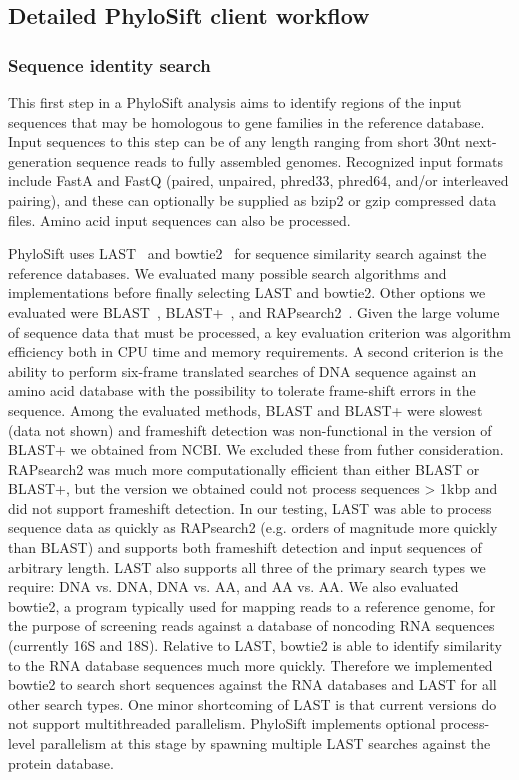 \documentclass[10pt]{article}
\begin{document}
\subsection*{Detailed PhyloSift client workflow}
\subsubsection*{Sequence identity search}
This first step in a PhyloSift analysis aims to identify regions of the input sequences that may be homologous to gene families in the reference database.
Input sequences to this step can be of any length ranging from short 30nt next-generation sequence reads to fully assembled genomes.
Recognized input formats include FastA and FastQ (paired, unpaired, phred33, phred64, and/or interleaved pairing), and these can optionally be supplied as bzip2 or gzip compressed data files. 
Amino acid input sequences can also be processed.

PhyloSift uses LAST~\cite{Kiełbasa2011} and bowtie2~\cite{Langmead2009} for sequence similarity search against the reference databases.
We evaluated many possible search algorithms and implementations before finally selecting LAST and bowtie2. 
Other options we evaluated were BLAST~\cite{Altschul1997}, BLAST+~\cite{Camacho2009}, and RAPsearch2~\cite{Zhao2011}.
Given the large volume of sequence data that must be processed, a key evaluation criterion was algorithm efficiency both in CPU time and memory requirements. 
A second criterion is the ability to perform six-frame translated searches of DNA sequence against an amino acid database with the possibility to tolerate frame-shift errors in the sequence.
Among the evaluated methods, BLAST and BLAST+ were slowest (data not shown) and frameshift detection was non-functional in the version of BLAST+ we obtained from NCBI. We excluded these from futher consideration.
RAPsearch2 was much more computationally efficient than either BLAST or BLAST+, but the version we obtained could not process sequences > 1kbp and did not support frameshift detection.
In our testing, LAST was able to process sequence data as quickly as RAPsearch2 (e.g. orders of magnitude more quickly than BLAST) and supports both frameshift detection and input sequences of arbitrary length.
LAST also supports all three of the primary search types we require: DNA vs. DNA, DNA vs. AA, and AA vs. AA.
We also evaluated bowtie2, a program typically used for mapping reads to a reference genome, for the purpose of screening reads against a database of noncoding RNA sequences (currently 16S and 18S).
Relative to LAST, bowtie2 is able to identify similarity to the RNA database sequences much more quickly.
Therefore we implemented bowtie2 to search short sequences against the RNA databases and LAST for all other search types.
One minor shortcoming of LAST is that current versions do not support multithreaded parallelism.
PhyloSift implements optional process-level parallelism at this stage by spawning multiple LAST searches against the protein database.
\end{document}
